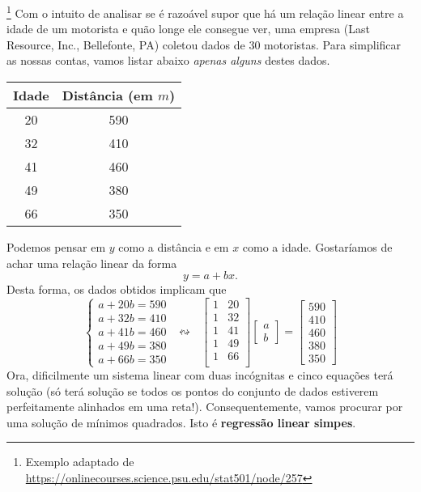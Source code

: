 \begin{ex}\footnote{Exemplo adaptado de \url{https://onlinecourses.science.psu.edu/stat501/node/257}}\label{exp:idade}
Com o intuito de analisar se é razoável supor que há um relação linear entre a idade de um motorista e quão longe ele consegue ver, uma empresa (Last Resource, Inc., Bellefonte, PA) coletou dados de 30 motoristas. Para simplificar as nossas contas, vamos listar abaixo \textit{apenas alguns} destes dados.
\begin{center}
 \begin{tabular}{|c|c|}
      \hline
      Idade & Distância (em $m$) \\ \hline
      20 & 590 \\
      32 & 410 \\
      41 & 460 \\
      49 & 380 \\
      66 & 350 \\
      \hline
  \end{tabular}
\end{center} Podemos pensar em $y$ como a distância e em $x$ como a idade. Gostaríamos de achar uma relação linear da forma
\begin{equation}
  y = a + b x.
\end{equation} Desta forma, os dados obtidos implicam que
\begin{equation}
\left\{
    \begin{array}{ll}
      a + 20 b = 590 \\
      a + 32 b = 410 \\
      a + 41 b = 460 \\
      a + 49 b = 380 \\
      a + 66 b = 350
    \end{array}
  \right. \ \ \leftrightsquigarrow \ \ \
  \begin{bmatrix}
    1 & 20 \\
    1 & 32 \\
    1 & 41 \\
    1 & 49 \\
    1 & 66 \\
  \end{bmatrix}
  \begin{bmatrix}
    a \\ b
  \end{bmatrix} =
  \begin{bmatrix}
    590 \\ 410 \\ 460 \\ 380 \\ 350
  \end{bmatrix}
  \end{equation} Ora, dificilmente um sistema linear com duas incógnitas e cinco equações terá solução (só terá solução se todos os pontos do conjunto de dados estiverem perfeitamente alinhados em uma reta!). Consequentemente, vamos procurar por uma solução de mínimos quadrados. Isto é \textbf{regressão linear simpes}.


\end{ex}
